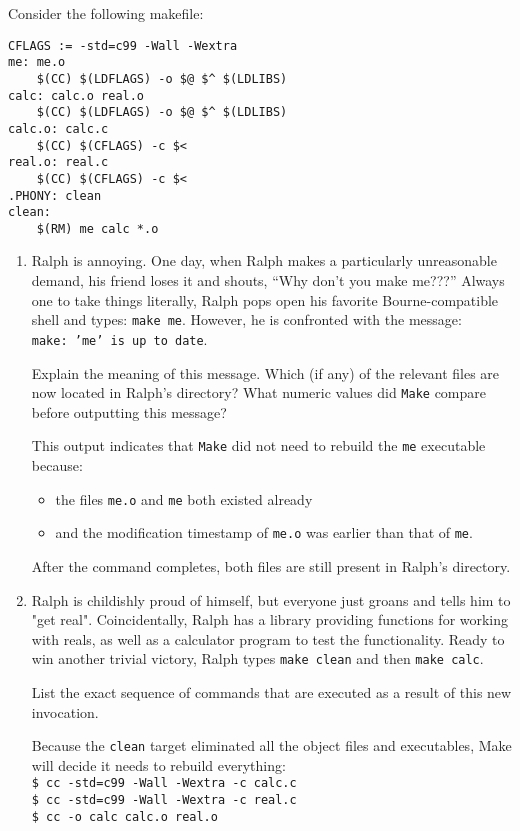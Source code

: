 Consider the following makefile:
\begin{lstlisting}
CFLAGS := -std=c99 -Wall -Wextra
me: me.o
    $(CC) $(LDFLAGS) -o $@ $^ $(LDLIBS)
calc: calc.o real.o
	$(CC) $(LDFLAGS) -o $@ $^ $(LDLIBS)
calc.o: calc.c
	$(CC) $(CFLAGS) -c $<
real.o: real.c
	$(CC) $(CFLAGS) -c $<
.PHONY: clean
clean:
	$(RM) me calc *.o
\end{lstlisting}

\begin{enumerate}
\item
Ralph is annoying.  One day, when Ralph makes a particularly unreasonable demand, his friend loses it and shouts, ``Why don't you make me???''
Always one to take things literally, Ralph pops open his favorite Bourne-compatible shell and types: \texttt{make me}.
However, he is confronted with the message: \texttt{make:\ 'me' is up to date}.

Explain the meaning of this message.  Which (if any) of the relevant files are now located in Ralph's directory?  What numeric values did \texttt{Make} compare before outputting this message?

\begin{answer}
This output indicates that \texttt{Make} did not need to rebuild the \texttt{me} executable because:
\begin{itemize}
	\item the files \texttt{me.o} and \texttt{me} both existed already
	\item and the modification timestamp of \texttt{me.o} was earlier than that of \texttt{me}.
\end{itemize}
After the command completes, both files are still present in Ralph's directory.
\end{answer}

\item
Ralph is childishly proud of himself, but everyone just groans and tells him to "get real".
Coincidentally, Ralph has a library providing functions for working with reals, as well as a calculator program to test the functionality.
Ready to win another trivial victory, Ralph types \texttt{make clean} and then \texttt{make calc}.

List the exact sequence of commands that are executed as a result of this new invocation.

\begin{answer}
Because the \texttt{clean} target eliminated all the object files and executables, Make will decide it needs to rebuild everything: \\
\texttt{\$ cc -std=c99 -Wall -Wextra -c calc.c} \\
\texttt{\$ cc -std=c99 -Wall -Wextra -c real.c} \\
\texttt{\$ cc -o calc calc.o real.o}
\end{answer}
\end{enumerate}
